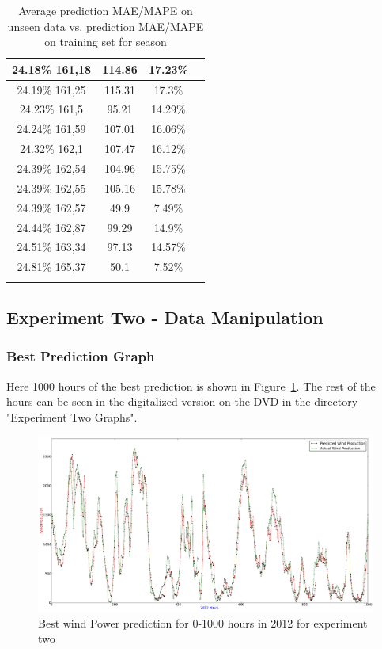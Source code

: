 \begin{center}
\begin{longtable}{|c|c|c|c|}
24.18\% 161,18 & 114.86 & 17.23\%  \\ \hline
24.19\% 161,25 & 115.31 & 17.3\%  \\ \hline
24.23\% 161,5 & 95.21 & 14.29\%  \\ \hline
24.24\% 161,59 & 107.01 & 16.06\%  \\ \hline
24.32\% 162,1 & 107.47 & 16.12\%  \\ \hline
24.39\% 162,54 & 104.96 & 15.75\%  \\ \hline
24.39\% 162,55 & 105.16 & 15.78\%  \\ \hline
24.39\% 162,57 & 49.9 & 7.49\%  \\ \hline
24.44\% 162,87 & 99.29 & 14.9\%  \\ \hline
24.51\% 163,34 & 97.13 & 14.57\%  \\ \hline
24.81\% 165,37 & 50.1 & 7.52\%  \\ \hline
\caption{Average prediction MAE/MAPE on unseen data vs. prediction MAE/MAPE on training set for season}
\label{table:predictionMAEUnseenVsTrainingSetSeasonAppendix}
\end{longtable}
\end{center}
\normalsize

\newpage
\subsection{Experiment Two - Data Manipulation}

\subsubsection{Best Prediction Graph}
Here 1000 hours of the best prediction is shown in Figure~\ref{fig:experimentTwoInput}. The rest of the hours can be seen in the digitalized version on the DVD in the directory "Experiment Two Graphs".

\begin{figure}
\centering
\includegraphics[width=0.99\linewidth]{billeder/experimentTwoInput.png}
\caption{Best wind Power prediction for 0-1000 hours in 2012 for experiment two}
\label{fig:experimentTwoInput}
\end{figure} 
\newpage
